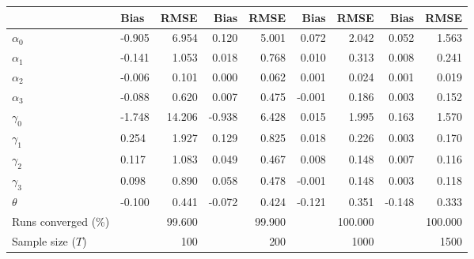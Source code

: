 
\begin{tabular}[t]{llrrrrrrr}
\toprule
  & Bias & RMSE & Bias & RMSE & Bias & RMSE & Bias & RMSE\\
\midrule
$\alpha_{0}$ & -0.905 & 6.954 & 0.120 & 5.001 & 0.072 & 2.042 & 0.052 & 1.563\\
$\alpha_{1}$ & -0.141 & 1.053 & 0.018 & 0.768 & 0.010 & 0.313 & 0.008 & 0.241\\
$\alpha_{2}$ & -0.006 & 0.101 & 0.000 & 0.062 & 0.001 & 0.024 & 0.001 & 0.019\\
$\alpha_{3}$ & -0.088 & 0.620 & 0.007 & 0.475 & -0.001 & 0.186 & 0.003 & 0.152\\
$\gamma_{0}$ & -1.748 & 14.206 & -0.938 & 6.428 & 0.015 & 1.995 & 0.163 & 1.570\\
$\gamma_{1}$ & 0.254 & 1.927 & 0.129 & 0.825 & 0.018 & 0.226 & 0.003 & 0.170\\
$\gamma_{2}$ & 0.117 & 1.083 & 0.049 & 0.467 & 0.008 & 0.148 & 0.007 & 0.116\\
$\gamma_{3}$ & 0.098 & 0.890 & 0.058 & 0.478 & -0.001 & 0.148 & 0.003 & 0.118\\
$\theta$ & -0.100 & 0.441 & -0.072 & 0.424 & -0.121 & 0.351 & -0.148 & 0.333\\
Runs converged (\%) &  & 99.600 &  & 99.900 &  & 100.000 &  & 100.000\\
Sample size ($T$) &  & 100 &  & 200 &  & 1000 &  & 1500\\
\bottomrule
\end{tabular}
